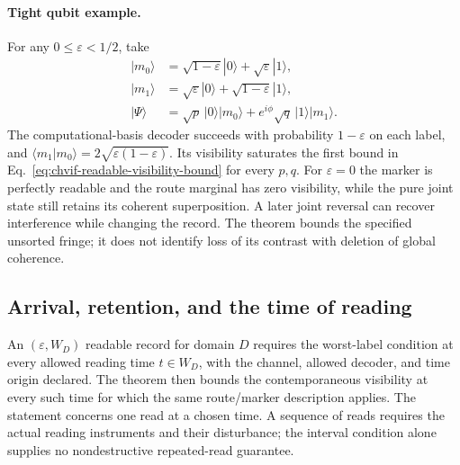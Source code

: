 \paragraph{Tight qubit example.}
For any $0\leq\varepsilon<1/2$, take
\begin{align}
 |m_0\rangle&=\sqrt{1-\varepsilon}|0\rangle
                      +\sqrt{\varepsilon}|1\rangle,\\
 |m_1\rangle&=\sqrt{\varepsilon}|0\rangle
                      +\sqrt{1-\varepsilon}|1\rangle,\\
 |\Psi\rangle&=\sqrt p\,|0\rangle|m_0\rangle
                 +e^{i\phi}\sqrt q\,|1\rangle|m_1\rangle.
 \label{eq:chvif-tight-record-qubits}
\end{align}
The computational-basis decoder succeeds with probability
$1-\varepsilon$ on each label, and
$\langle m_1|m_0\rangle=2\sqrt{\varepsilon(1-\varepsilon)}$.
Its visibility saturates the first bound in
Eq.~\eqref{eq:chvif-readable-visibility-bound} for every $p,q$.
For $\varepsilon=0$ the marker is perfectly readable and the route marginal
has zero visibility, while the pure joint state still retains its coherent
superposition. A later joint reversal can recover interference while
changing the record. The theorem bounds the specified unsorted fringe;
it does not identify loss of its contrast with deletion of global coherence.

\subsection{Arrival, retention, and the time of reading}
\label{sec:chvif-record-arrival}

An $(\varepsilon,W_D)$ readable record for domain $D$ requires the
worst-label condition at every allowed reading time $t\in W_D$, with
the channel, allowed decoder, and time origin declared. The theorem then
bounds the contemporaneous visibility at every such time for which the
same route/marker description applies. The statement concerns one read
at a chosen time. A sequence of reads requires the actual reading
instruments and their disturbance; the interval condition alone supplies
no nondestructive repeated-read guarantee.

